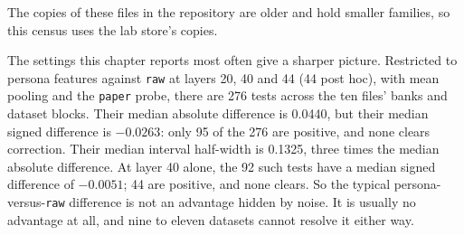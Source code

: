 The copies of these files in the repository are older and hold smaller families, so this census uses the lab store's copies. %

The settings this chapter reports most often give a sharper picture.
Restricted to persona features against \texttt{raw} at layers 20, 40 and 44 (44 post hoc), with mean pooling and the \texttt{paper} probe, there are 276 tests across the ten files' banks and dataset blocks. %
Their median absolute difference is 0.0440, but their median signed difference is $-0.0263$: only 95 of the 276 are positive, and none clears correction. %
Their median interval half-width is 0.1325, three times the median absolute difference. %
At layer 40 alone, the 92 such tests have a median signed difference of $-0.0051$; 44 are positive, and none clears. %
So the typical persona-versus-\texttt{raw} difference is not an advantage hidden by noise. %
It is usually no advantage at all, and nine to eleven datasets cannot resolve it either way. %

